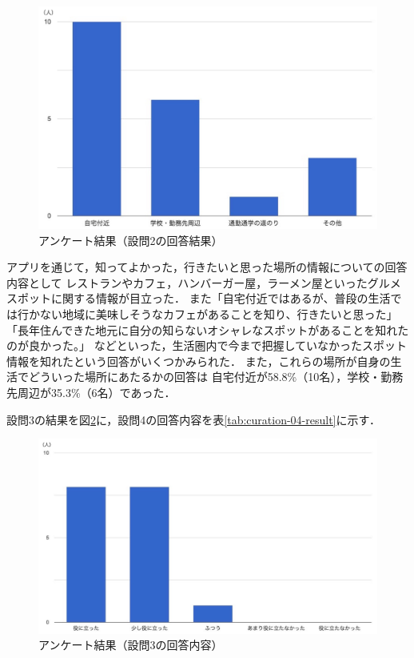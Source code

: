 \documentclass[a4paper]{jsarticle}
\begin{document}
\begin{enumerate}
\begin{enumerate}
\begin{enumerate}
  \fifigure
  \begin{figure}[H]
    \begin{center}
      \includegraphics[width=0.8\hsize]{./images/curation_02_result.jpg}
      \caption{アンケート結果（設問2の回答結果）}
      \label{fig:curation_02_result}
    \end{center}
  \end{figure}
  \fi

  アプリを通じて，知ってよかった，行きたいと思った場所の情報についての回答内容として
  レストランやカフェ，ハンバーガー屋，ラーメン屋といったグルメスポットに関する情報が目立った．
  また「自宅付近ではあるが、普段の生活では行かない地域に美味しそうなカフェがあることを知り、行きたいと思った」「長年住んできた地元に自分の知らないオシャレなスポットがあることを知れたのが良かった。」
  などといった，生活圏内で今まで把握していなかったスポット情報を知れたという回答がいくつかみられた．
  また，これらの場所が自身の生活でどういった場所にあたるかの回答は
  自宅付近が58.8\%（10名），学校・勤務先周辺が35.3\%（6名）であった．

  設問3の結果を図\ref{fig:curation_03_result}に，設問4の回答内容を表\ref{tab:curation-04-result}に示す．

  \fifigure
  \begin{figure}[H]
    \begin{center}
      \includegraphics[width=0.8\hsize]{./images/curation_03_result.jpg}
      \caption{アンケート結果（設問3の回答内容）}
      \label{fig:curation_03_result}
    \end{center}
  \end{figure}
  \fi


\end{enumerate}
\end{enumerate}
\end{enumerate}
\end{document}
